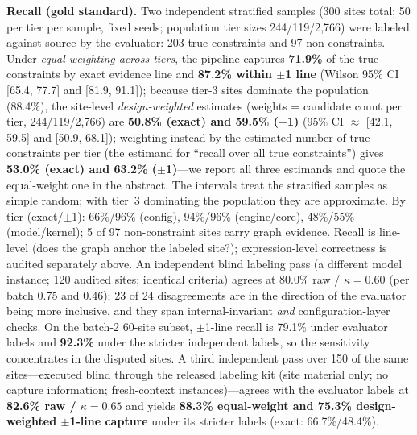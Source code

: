 \documentclass[journal]{IEEEtran}
\begin{document}
\textbf{Recall (gold standard).} Two independent stratified samples (300 sites total; 50 per tier per sample, fixed seeds; population tier sizes 244/119/2{,}766) were labeled against source by the evaluator: 203 true constraints and 97 non-constraints. Under \emph{equal weighting across tiers}, the pipeline captures \textbf{71.9\%} of the true constraints by exact evidence line and \textbf{87.2\% within $\pm$1 line} (Wilson 95\% CI [65.4, 77.7] and [81.9, 91.1]); because tier-3 sites dominate the population (88.4\%), the site-level \emph{design-weighted} estimates (weights = candidate count per tier, 244/119/2{,}766) are \textbf{50.8\% (exact) and 59.5\% ($\pm$1)} (95\% CI $\approx$ [42.1, 59.5] and [50.9, 68.1]); weighting instead by the estimated number of true constraints per tier (the estimand for ``recall over all true constraints'') gives \textbf{53.0\% (exact) and 63.2\% ($\pm$1)}---we report all three estimands and quote the equal-weight one in the abstract. The intervals treat the stratified samples as simple random; with tier~3 dominating the population they are approximate. By tier (exact/$\pm$1): 66\%/96\% (config), 94\%/96\% (engine/core), 48\%/55\% (model/kernel); 5 of 97 non-constraint sites carry graph evidence. Recall is line-level (does the graph anchor the labeled site?); expression-level correctness is audited separately above. An independent blind labeling pass (a different model instance; 120 audited sites; identical criteria) agrees at 80.0\% raw / $\kappa = 0.60$ (per batch 0.75 and 0.46); 23 of 24 disagreements are in the direction of the evaluator being more inclusive, and they span internal-invariant \emph{and} configuration-layer checks. On the batch-2 60-site subset, $\pm$1-line recall is 79.1\% under evaluator labels and \textbf{92.3\%} under the stricter independent labels, so the sensitivity concentrates in the disputed sites. A third independent pass over 150 of the same sites---executed blind through the released labeling kit (site material only; no capture information; fresh-context instances)---agrees with the evaluator labels at \textbf{82.6\% raw / $\kappa=0.65$} and yields \textbf{88.3\% equal-weight and 75.3\% design-weighted $\pm$1-line capture} under its stricter labels (exact: 66.7\%/48.4\%).
\end{document}

